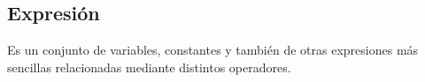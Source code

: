 \subsection{Expresión} 
Es un conjunto de variables, constantes y
también de otras expresiones más sencillas relacionadas mediante distintos operadores.